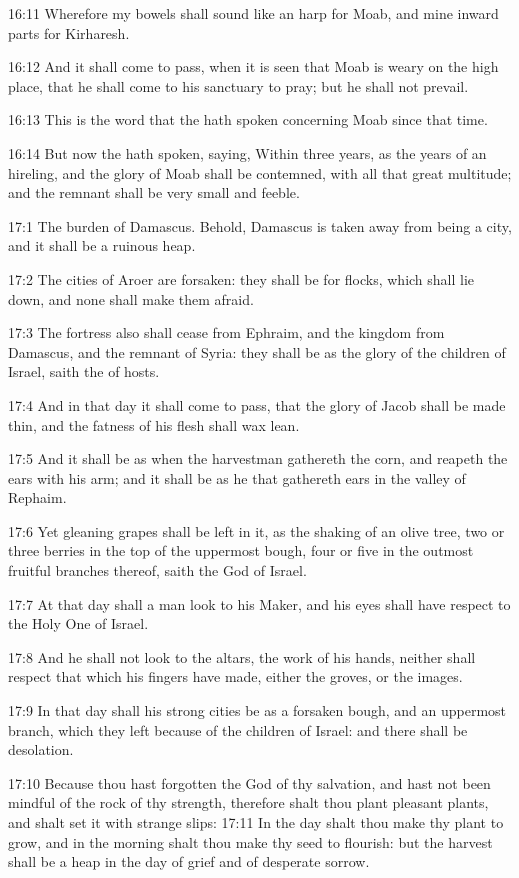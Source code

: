 16:11 Wherefore my bowels shall sound like an harp for Moab, and mine inward parts for Kirharesh.

16:12 And it shall come to pass, when it is seen that Moab is weary on the high place, that he shall come to his sanctuary to pray; but he shall not prevail.

16:13 This is the word that the \LORD hath spoken concerning Moab since that time.

16:14 But now the \LORD hath spoken, saying, Within three years, as the years of an hireling, and the glory of Moab shall be contemned, with all that great multitude; and the remnant shall be very small and feeble.

17:1 The burden of Damascus. Behold, Damascus is taken away from being a city, and it shall be a ruinous heap.

17:2 The cities of Aroer are forsaken: they shall be for flocks, which shall lie down, and none shall make them afraid.

17:3 The fortress also shall cease from Ephraim, and the kingdom from Damascus, and the remnant of Syria: they shall be as the glory of the children of Israel, saith the \LORD of hosts.

17:4 And in that day it shall come to pass, that the glory of Jacob shall be made thin, and the fatness of his flesh shall wax lean.

17:5 And it shall be as when the harvestman gathereth the corn, and reapeth the ears with his arm; and it shall be as he that gathereth ears in the valley of Rephaim.

17:6 Yet gleaning grapes shall be left in it, as the shaking of an olive tree, two or three berries in the top of the uppermost bough, four or five in the outmost fruitful branches thereof, saith the \LORD God of Israel.

17:7 At that day shall a man look to his Maker, and his eyes shall have respect to the Holy One of Israel.

17:8 And he shall not look to the altars, the work of his hands, neither shall respect that which his fingers have made, either the groves, or the images.

17:9 In that day shall his strong cities be as a forsaken bough, and an uppermost branch, which they left because of the children of Israel: and there shall be desolation.

17:10 Because thou hast forgotten the God of thy salvation, and hast not been mindful of the rock of thy strength, therefore shalt thou plant pleasant plants, and shalt set it with strange slips: 17:11 In the day shalt thou make thy plant to grow, and in the morning shalt thou make thy seed to flourish: but the harvest shall be a heap in the day of grief and of desperate sorrow.

